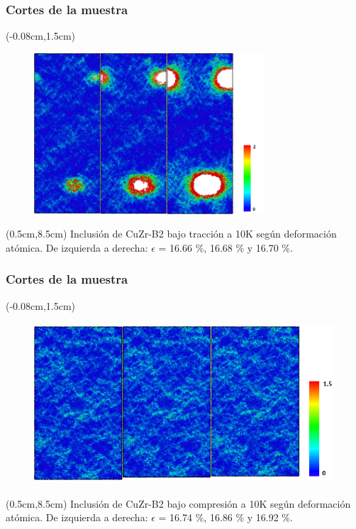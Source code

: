 \begin{frame}
  \frametitle{Cortes de la muestra}
  \begin{textblock*}{12.6cm}(-0.08cm,1.5cm) 
    \begin{figure}[htp]
     \centering
     \includegraphics[height=6cm]{B2SphereTension_10K_Snapshots.png}
    \end{figure}
  \end{textblock*}
  \begin{textblock*}{12cm}(0.5cm,8.5cm) 
    \centering
      \small{Inclusión de CuZr-B2 bajo tracción a 10K según deformación atómica. De izquierda a derecha: $\epsilon$ = 16.66 \%, 16.68 \% y 16.70 \%.}
    \end{textblock*}
\end{frame}

\begin{frame}
  \frametitle{Cortes de la muestra}
  \begin{textblock*}{12.6cm}(-0.08cm,1.5cm) 
    \begin{figure}[htp]
     \centering
     \includegraphics[height=6cm]{B2SphereCompression_10K_Snapshots.png}
    \end{figure}
  \end{textblock*}
  \begin{textblock*}{12cm}(0.5cm,8.5cm) 
    \centering
      \small{Inclusión de CuZr-B2 bajo compresión a 10K según deformación atómica. De izquierda a derecha: $\epsilon$ = 16.74 \%, 16.86 \% y 16.92 \%.}
    \end{textblock*}
\end{frame}

